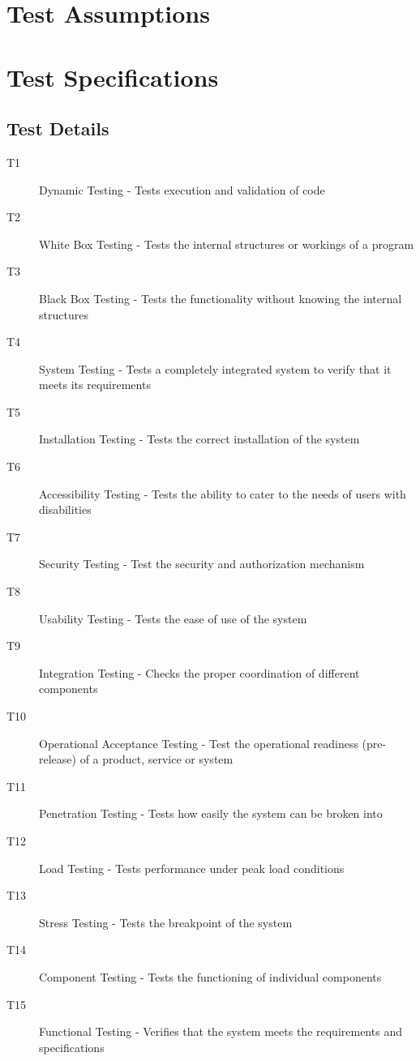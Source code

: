 \documentclass[a4paper,twoside,phd]{BYUPhys}
\begin{document}
\section{Test Assumptions}
\section{Test Specifications}

\subsection{Test Details}
\begin{description}
\item[T1] Dynamic Testing - Tests execution and validation of code
\item[T2] White Box Testing - Tests the internal structures or workings of a program
\item[T3] Black Box Testing - Tests the functionality without knowing the internal structures
\item[T4] System Testing - Tests a completely integrated system to verify that it meets its requirements
\item[T5] Installation Testing - Tests the correct installation of the system
\item[T6] Accessibility Testing - Tests the ability to cater to the needs of users with disabilities
\item[T7] Security Testing - Test the security and authorization mechanism
\item[T8] Usability Testing - Tests the ease of use of the system
\item[T9] Integration Testing - Checks the proper coordination of different components
\item[T10] Operational Acceptance Testing - Test the operational readiness (pre-release) of a product, service or system
\item[T11] Penetration Testing - Tests how easily the system can be broken into
\item[T12] Load Testing - Tests performance under peak load conditions
\item[T13] Stress Testing - Tests the breakpoint of the system
\item[T14] Component Testing - Tests the functioning of individual components
\item[T15] Functional Testing - Verifies that the system meets the requirements and specifications
\end{description}
\end{document}
